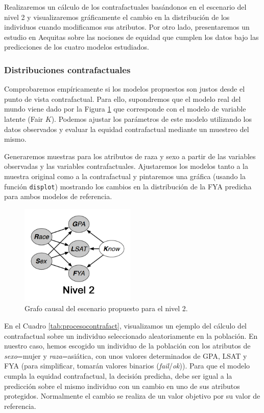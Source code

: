 \documentclass[oneside,openright,titlepage,numbers=noenddot,openany,headinclude,footinclude=true,
cleardoublepage=empty,abstractoff,BCOR=5mm,paper=a4,fontsize=12pt,main=spanish]{scrreprt}
\begin{document}
Realizaremos un cálculo de los contrafactuales basándonos en el escenario del nivel 2 y visualizaremos gráficamente el cambio en la distribución de los individuos cuando modificamos sus atributos. Por otro lado, presentaremos un estudio en Aequitas sobre las nociones de equidad que cumplen los datos bajo las predicciones de los cuatro modelos estudiados.

\subsubsection{Distribuciones contrafactuales} \label{subsec:graficas}

Comprobaremos empíricamente si los modelos propuestos son justos desde el punto de vista contrafactual. Para ello, supondremos que el modelo real del mundo viene dado por la Figura \ref{fig:nivel2solo} que corresponde con el modelo de variable latente (Fair $K$). Podemos ajustar los parámetros de este modelo utilizando los datos observados y evaluar la equidad contrafactual mediante un muestreo del mismo. 

Generaremos muestras para los atributos de raza y sexo a partir de las variables observadas y las variables contrafactuales. Ajustaremos los modelos tanto a la muestra original como a la contrafactual y pintaremos una gráfica (usando la función \texttt{displot}) mostrando los cambios en la distribución de la FYA predicha para ambos modelos de referencia.\\

\begin{figure}[h]
	\centering
	\includegraphics[width=5.5cm]{nivel2grafo.png}
	\caption{Grafo causal del escenario propuesto para el nivel 2.}
    \label{fig:nivel2solo}
\end{figure}

En el Cuadro \ref{tab:procesocontrafact}, visualizamos un ejemplo del cálculo del contrafactual sobre un individuo seleccionado aleatoriamente en la población. En nuestro caso, hemos escogido un individuo de la población con los atributos de \textit{sexo}=mujer y \textit{raza}=asiática, con unos valores determinados de GPA, LSAT y FYA (para simplificar, tomarán valores binarios (\textit{fail}/\textit{ok})). Para que el modelo cumpla la equidad contrafactual, la decisión predicha, debe ser igual a la predicción sobre el mismo individuo con un cambio en uno de sus atributos protegidos. Normalmente el cambio se realiza de un valor objetivo por su valor de referencia.\\
\end{document}
